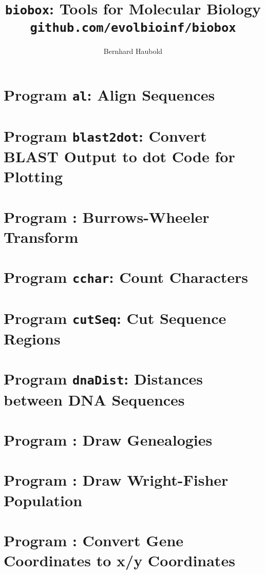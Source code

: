\documentclass[a4paper]{report}
\begin{document}
\pagestyle{noweb}

\title{\texttt{biobox}: Tools for Molecular Biology\\
\small\texttt{github.com/evolbioinf/biobox}}
\author{Bernhard Haubold}
\maketitle
\tableofcontents

\chapter{Program \texttt{al}: Align Sequences}\label{ch:al}

\chapter{Program \texttt{blast2dot}: Convert BLAST Output to dot Code
  for Plotting}\label{ch:b2d}

\chapter{Program : Burrows-Wheeler Transform}\label{ch:bw}

\chapter{Program \texttt{cchar}: Count Characters}\label{ch:cch}

\chapter{Program \texttt{cutSeq}: Cut Sequence Regions}\label{ch:cut}

\chapter{Program \texttt{dnaDist}: Distances between DNA Sequences}\label{ch:dna}

\chapter{Program : Draw Genealogies}\label{ch:dgn}

\chapter{Program : Draw Wright-Fisher
  Population}\label{ch:dw}

\chapter{Program : Convert Gene Coordinates to x/y
  Coordinates}\label{ch:dg}

\end{document}

